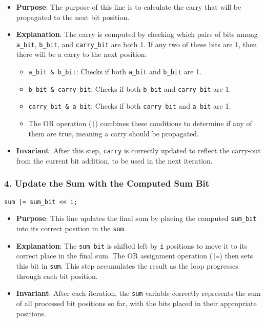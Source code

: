 \documentclass{article}
\begin{document}
\begin{itemize}
    \item \textbf{Purpose}: 
    The purpose of this line is to calculate the carry that will be propagated to the next bit position.
    \item \textbf{Explanation}: 
    The carry is computed by checking which pairs of bits among \texttt{a\_bit}, \texttt{b\_bit}, and \texttt{carry\_bit} are both 1. If any two of these bits are 1, then there will be a carry to the next position:
    \begin{itemize}
        \item \texttt{a\_bit \& b\_bit}: Checks if both \texttt{a\_bit} and \texttt{b\_bit} are 1.
        \item \texttt{b\_bit \& carry\_bit}: Checks if both \texttt{b\_bit} and \texttt{carry\_bit} are 1.
        \item \texttt{carry\_bit \& a\_bit}: Checks if both \texttt{carry\_bit} and \texttt{a\_bit} are 1.
        \item The OR operation (\texttt{|}) combines these conditions to determine if any of them are true, meaning a carry should be propagated.
    \end{itemize}
    \item \textbf{Invariant}: 
    After this step, \texttt{carry} is correctly updated to reflect the carry-out from the current bit addition, to be used in the next iteration.
\end{itemize}

\subsubsection*{4. Update the Sum with the Computed Sum Bit}

\begin{verbatim}
sum |= sum_bit << i;
\end{verbatim}

\begin{itemize}
    \item \textbf{Purpose}: 
    This line updates the final sum by placing the computed \texttt{sum\_bit} into its correct position in the \texttt{sum}.
    \item \textbf{Explanation}: 
    The \texttt{sum\_bit} is shifted left by \texttt{i} positions to move it to its correct place in the final sum. The OR assignment operation (\texttt{|=}) then sets this bit in \texttt{sum}. This step accumulates the result as the loop progresses through each bit position.
    \item \textbf{Invariant}: 
    After each iteration, the \texttt{sum} variable correctly represents the sum of all processed bit positions so far, with the bits placed in their appropriate positions.
\end{itemize}
\end{document}
